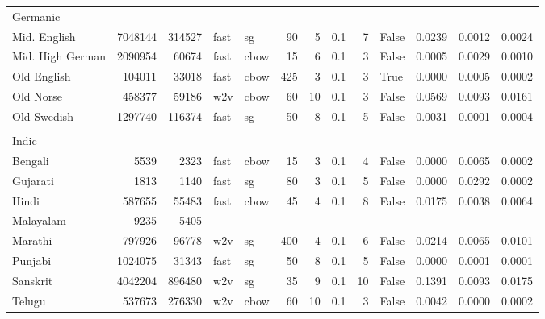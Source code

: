 \documentclass[11pt,a4paper]{article}
\begin{document}
\begin{table}[t]
\begin{tabular}{lrrllrrrrlrrr}
    Germanic &&&&&&&&&&&& \\
\quad Mid. English & \num{7048144} & \num{314527} & fast & sg & \num{90} & \num{5} & \num{.1} & \num{7} & False & 0.0239 & 0.0012 & 0.0024 \\
   \quad Mid. High German & \num{2090954} & \num{60674} & fast & cbow & \num{15} & \num{6} & \num{.1} & \num{3} & False & 0.0005 & 0.0029 & 0.0010 \\
   \quad Old English  & \num{104011} & \num{33018} & fast & cbow & \num{425} & \num{3} & \num{.1} & \num{3} & True & 0.0000 & 0.0005  & 0.0002 \\
   \quad Old Norse & \num{458377} & \num{59186} & w2v & cbow & \num{60} & \num{10} & \num{.1} & \num{3} & False & 0.0569 & 0.0093 & 0.0161 \\
   \quad Old Swedish & \num{1297740} & \num{116374} &  fast & sg & \num{50} & \num{8} & \num{.1} & \num{5} & False & 0.0031 & 0.0001 & 0.0004 \\
    &&&&&&&&&&&&\\[-4pt]
    Indic&&&&&&&&&&&&\\
\quad Bengali & \num{5539} & \num{2323} & fast & cbow & \num{15} & \num{3} & \num{.1} & \num{4} & False & 0.0000 & 0.0065 & 0.0002 \\
   \quad Gujarati & \num{1813} & \num{1140} & fast & sg & \num{80} & \num{3} & \num{.1} & \num{5} & False & 0.0000 & 0.0292 & 0.0002 \\
   \quad Hindi & \num{587655} & \num{55483} & fast & cbow & \num{45} & \num{4} & \num{.1} & \num{8} & False & 0.0175 & 0.0038 & 0.0064\\
   \quad Malayalam & \num{9235} & \num{5405} & - & - & - & - & - & - & - & - & - & - \\
    \quad Marathi  & \num{797926} & \num{96778} & w2v & sg & \num{400} & \num{4} & \num{.1} & \num{6} & False & 0.0214 & 0.0065 & 0.0101 \\
    \quad Punjabi & \num{1024075} & \num{31343} & fast & sg & \num{50} & \num{8} & \num{.1} & \num{5} & False & 0.0000 & 0.0001 & 0.0001 \\
    \quad Sanskrit & \num{4042204} & \num{896480} & w2v & sg & \num{35} & \num{9} & \num{.1} & \num{10} & False & 0.1391 & 0.0093 & 0.0175\\
    \quad Telugu & \num{537673} & \num{276330} &  w2v & cbow & \num{60} & \num{10} & \num{.1} & \num{3} & False & 0.0042 & 0.0000 & 0.0002 \\

\end{tabular}
\end{table}
\end{document}
